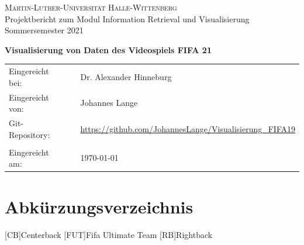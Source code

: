 \documentclass[usegeometry=true]{scrartcl}
\begin{document}

\begin{titlepage}
	\begin{center}
		\large{\textsc{Martin-Luther-Universität Halle-Wittenberg}}\\
				

		Projektbericht zum Modul Information Retrieval und Visualisierung Sommersemester 2021
	\end{center}

	\begin{center}
		\Large
		\textbf{Visualisierung von Daten des Videospiels FIFA 21}
	\end{center}

	\vskip 1cm

	\vskip 0.75cm

	\begin{center}
		\begin{tabular}{lll}
			Eingereicht bei:& & Dr. Alexander Hinneburg\\
			Eingereicht von:  & & Johannes Lange \\
			Git-Repository: & & \url{https://github.com/JohannesLange/Visualisierung_FIFA19}\\
			& & \\
			Eingereicht am: & & \today
		\end{tabular}
	\end{center}

\end{titlepage}




\newpage
\tableofcontents
\newpage

\clearpage
{}
\listoffigures

\section*{Abkürzungsverzeichnis}\label{AV}
	\begin{acronym}
	[CB]{Centerback}
	[FUT]{Fifa Ultimate Team}
	[RB]{Rightback}
	\end{acronym}
\newpage
\end{document}

